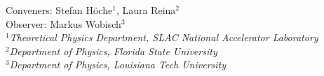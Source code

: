 

\begin{center}
{\large Conveners: Stefan H{\"o}che$^1$,  Laura Reina$^2$\\
  Observer: Markus Wobisch$^3$} \\
\bigskip
$^1${\it Theoretical Physics Department, SLAC National Accelerator Laboratory}\\
$^2${\it Department of Physics, Florida State University}\\
$^3${\it Department of Physics, Louisiana Tech University }\\
\end{center}


